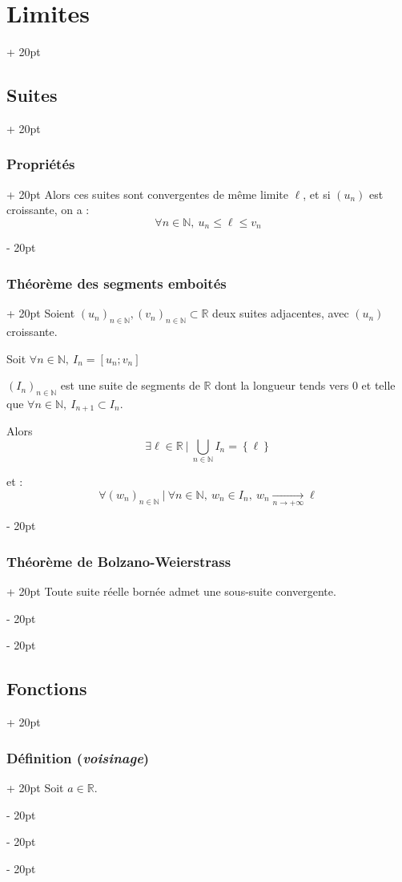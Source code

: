 \documentclass[a4paper, 12pt, twoside]{article}
\newcommand{\N}{\mathbb{N}} %
\newcommand{\R}{\mathbb{R}} %
\newcommand{\tendsto}[1]{\xrightarrow[#1]{}}
\newcommand{\set}[1]{\left\{ #1 \right\}}
\renewcommand{\le}{\leqslant}
\newcommand{\ind}[1][20pt]{\advance\leftskip + #1}
\newcommand{\deind}[1][20pt]{\advance\leftskip - #1}
\newenvironment{indt}[2][20pt]{#2 \par \ind[#1]}{\par \deind} %
\begin{document}
\begin{indt}{\section{Limites}}
\begin{indt}{\subsection{Suites}}
\begin{indt}{\subsubsection{Propriétés}}
                Alors ces suites sont convergentes de même limite $\ell$, et si $(u_n)$ est croissante, on a :
                \[
                    \forall n \in \N,\ u_n \le \ell \le v_n
                \]
            \end{indt}

            \vspace{12pt}
            
            \begin{indt}{\subsubsection{Théorème des segments emboités}}
                Soient $(u_n)_{n \in \N}, (v_n)_{n \in \N} \subset \R$ deux suites adjacentes, avec $(u_n)$ croissante.

                Soit $\forall n \in \N,\ I_n = [u_n ; v_n]$

                $(I_n)_{n \in \N}$ est une suite de segments de $\R$ dont la longueur tends vers $0$ et telle que $\forall n \in \N,\ I_{n + 1} \subset I_n$.

                \vspace{12pt}
                
                Alors
                \[
                    \displaystyle \exists \ell \in \R\ |\ \bigcup_{n \in \N} I_n = \set \ell
                \]

                et :
                \[
                    \forall (w_n)_{n \in \N}\ |\ \forall n \in \N,\ w_n \in I_n,\ w_n \tendsto{n \to +\infty} \ell
                \]
            \end{indt}

            \vspace{12pt}
            
            \begin{indt}{\subsubsection{Théorème de Bolzano-Weierstrass}}
                Toute suite réelle bornée admet une sous-suite convergente.
            \end{indt}
        \end{indt}

        \vspace{12pt}
        
        \begin{indt}{\subsection{Fonctions}}
            \begin{indt}{\subsubsection{Définition (\textit{voisinage})}}
                Soit $a \in \R$.


\end{indt}
\end{indt}
\end{indt}
\end{document}
